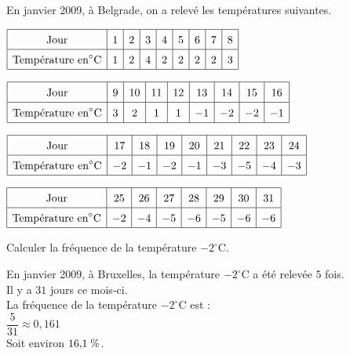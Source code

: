 \begin{corrige}
    En janvier 2009, à Belgrade, on a relevé les températures suivantes.

    \smallskip
    $\def\arraystretch{1.5}
    \begin{array}{|c|c|c|c|c|c|c|c|c|}
        \hline  
        \text{Jour}                             &1&2&3&4&5&6&7&8\\\hline
        \text{Température en}  ^\circ\text{C}   &1&2&4&2&2&2&2&3\\\hline
    \end{array}$
    
    $\def\arraystretch{1.5}
    \begin{array}{|c|c|c|c|c|c|c|c|c|}
        \hline
        \text{Jour}                             &9&10&11&12&13&14&15&16\\\hline 
        \text{Température en}  ^\circ\text{C}   &3&2 &1 &1 &-1&-2&-2&-1\\\hline
    \end{array}$

    $\def\arraystretch{1.5}
    \begin{array}{|c|c|c|c|c|c|c|c|c|}
        \hline
        \text{Jour}                             &17&18&19&20&21&22&23&24\\\hline
        \text{Température en}  ^\circ\text{C}   &-2&-1&-2&-1&-3&-5&-4&-3\\\hline
    \end{array}$

    $\def\arraystretch{1.5}
    \begin{array}{|c|c|c|c|c|c|c|c|}
        \hline
        \text{Jour}                             &25&26&27&28&29&30&31\\\hline
        \text{Température en}  ^\circ\text{C}   &-2&-4&-5&-6&-5&-6&-6\\\hline
    \end{array}$

    \medskip
    Calculer la fréquence de la température $-2^\circ\text{C}$.
    
    {\red
    \begin{spacing}{1.5}
        En janvier 2009, à Bruxelles, la température $-2^\circ\text{C}$ a été relevée $5$ fois.\\
        Il y a $31$ jours ce mois-ci.\\
         La fréquence de la température $-2^\circ\text{C}$ est :\\
        $\dfrac{5}{31}$$\approx0{,}161$\\
        Soit environ $16{,}1\thickspace\%$.
    \end{spacing}
    }
\end{corrige}

